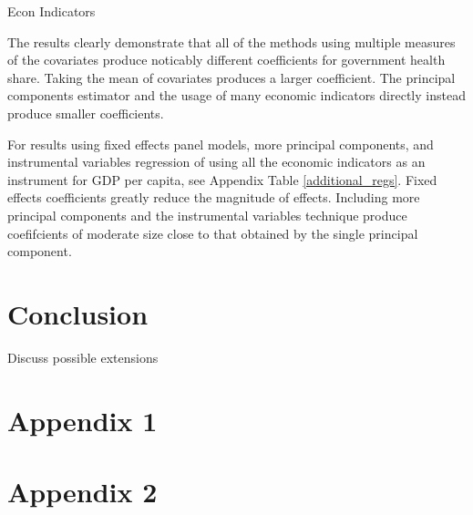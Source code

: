 \documentclass[12pt]{article}
\begin{document}
        

        \begin{table}[!htbp] \centering
            \caption{Econ Indicators \label{Econ_Indicators}}
            
        \end{table}

        The results clearly demonstrate that all of the methods using multiple measures of the covariates produce noticably different coefficients for government health share. Taking the mean of covariates produces a larger coefficient. The principal components estimator and the usage of many economic indicators directly instead produce smaller coefficients.

        For results using fixed effects panel models, more principal components, and instrumental variables regression of using all the economic indicators as an instrument for GDP per capita, see Appendix Table \ref{additional_regs}. Fixed effects coefficients greatly reduce the magnitude of effects. Including more principal components and the instrumental variables technique produce coefifcients of moderate size close to that obtained by the single principal component.


    \section*{Conclusion}
        
        Discuss possible extensions

    \clearpage \newpage

    \appendix

    \section*{Appendix 1}

        
        
        
        
        
    \section*{Appendix 2}
\end{document}
